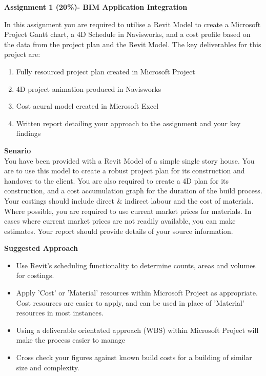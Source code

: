 
	
\begin{flushleft}
\Large\textbf{Assignment 1 (20\%)- BIM Application Integration}\\
\end{flushleft}

In this assignment you are required to utilise a Revit Model to create a Microsoft Project Gantt chart, a 4D Schedule in Navisworks, and a cost profile based on the data from the project plan and the Revit Model.  The key deliverables for this project are:

\begin{enumerate}
	\item Fully resourced project plan created in Microsoft Project
	\item 4D project animation produced in Navisworks
	\item Cost acural model created in Microsoft Excel
	\item Written report detailing your approach to the assignment and your key findings
\end{enumerate}

\textbf{Senario}\\


You have been provided with a Revit Model of a simple single story house.  You are to use this model to create a robust project plan for its construction and handover to the client.  You are also required to create a 4D plan for its construction, and a cost accumulation graph for the duration of the build process.  Your costings should include direct \& indirect labour and the cost of materials.  Where possible, you are required to use current market prices for materials.  In cases where current market prices are not readily available, you can make estimates.  Your report should provide details of your source information.





\vspace{.5cm}

\textbf{Suggested Approach}

\begin{itemize}
	\item Use Revit's scheduling functionality to determine counts, areas and volumes for costings.
	\item Apply 'Cost' or 'Material' resources within Microsoft Project as appropriate.  Cost resources are easier to apply, and can be used in place of 'Material' resources in most instances.
	\item Using a deliverable orientated approach (WBS) within Microsoft Project will make the process easier to manage
	\item Cross check your figures against known build costs for a building of similar size and complexity.

\end{itemize}

